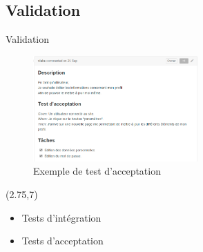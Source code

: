 \subsection{Validation}
\begin{frame}{Validation}
		\begin{figure}
			\vspace{-60px}
			\centering
			\includegraphics[width=6.3cm]{images/Process/accept-tests.png}
			\caption{\scriptsize Exemple de test d'acceptation}
			\label{fig:accept-tests}
		\end{figure}	
		\begin{minipage}{5cm}
			\begin{textblock}{6}(2.75,7)
			\begin{itemize}
				\item Tests d'intégration
				\item Tests d'acceptation
			\end{itemize}
			\end{textblock}
		\end{minipage}
\end{frame}


